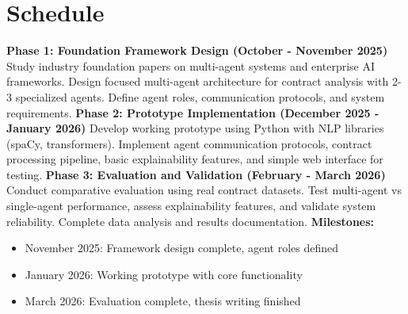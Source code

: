
\section{Schedule}\label{section:schedule}

\textbf{Phase 1: Foundation Framework Design (October - November 2025)}
Study industry foundation papers on multi-agent systems and enterprise AI frameworks. Design focused multi-agent architecture for contract analysis with 2-3 specialized agents. Define agent roles, communication protocols, and system requirements.
\newline
\break
\textbf{Phase 2: Prototype Implementation (December 2025 - January 2026)}
Develop working prototype using Python with NLP libraries (spaCy, transformers). Implement agent communication protocols, contract processing pipeline, basic explainability features, and simple web interface for testing.
\newline
\break  
\textbf{Phase 3: Evaluation and Validation (February - March 2026)}
Conduct comparative evaluation using real contract datasets. Test multi-agent vs single-agent performance, assess explainability features, and validate system reliability. Complete data analysis and results documentation.
\newline
\break
\textbf{Milestones:}
\begin{itemize}
    \item November 2025: Framework design complete, agent roles defined
    \item January 2026: Working prototype with core functionality
    \item March 2026: Evaluation complete, thesis writing finished
\end{itemize}
